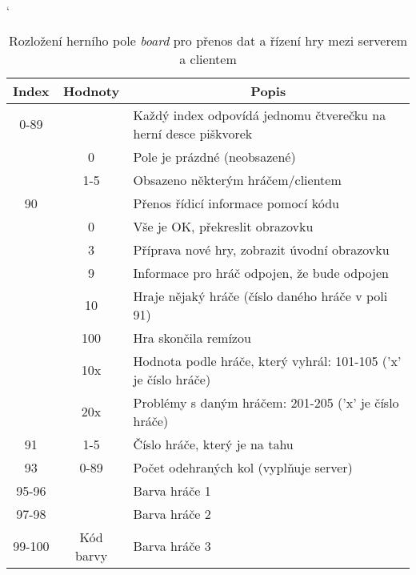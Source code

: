 \begin{table}[hbtp]
\catcode`
\caption{\label{tab:board_content}Rozložení herního pole \textit{board} pro přenos dat a řízení hry mezi serverem a clientem}
\begin{tabular}{|c|c|l|}
\hline
Index   & Hodnoty     & \multicolumn{1}{c|}{Popis}                                      \\ \hline
0-89    &             & Každý index odpovídá jednomu čtverečku na herní desce piškvorek \\ \cline{2-3} 
        & 0           & Pole je prázdné (neobsazené)                                    \\ \cline{2-3} 
        & 1-5         & Obsazeno některým hráčem/clientem                               \\ \hline
90      &             & Přenos řídicí informace pomocí kódu                             \\ \cline{2-3} 
        & 0           & Vše je OK, překreslit obrazovku                                 \\ \cline{2-3} 
        & 3           & Příprava nové hry, zobrazit úvodní obrazovku                    \\ \cline{2-3} 
        & 9           & Informace pro hráč odpojen, že bude odpojen                     \\ \cline{2-3} 
        & 10          & Hraje nějaký hráče (číslo daného hráče v poli 91)               \\ \cline{2-3} 
        & 100         & Hra skončila remízou                                            \\ \cline{2-3} 
        & 10x         & Hodnota podle hráče, který vyhrál: 101-105 ('x' je číslo hráče) \\ \cline{2-3} 
        & 20x         & Problémy s daným hráčem: 201-205 ('x' je číslo hráče)           \\ \hline
91      & 1-5         & Číslo hráče, který je na tahu                                   \\ \hline
93      & 0-89        & Počet odehraných kol (vyplňuje server)                          \\ \hline
95-96   &             & Barva hráče 1                                                   \\ \cline{1-1} \cline{3-3} 
97-98   &             & Barva hráče 2                                                   \\ \cline{1-1} \cline{3-3} 
99-100  & Kód barvy   & Barva hráče 3                                                   \\ \cline{1-1} \cline{3-3} 

\end{tabular}
\end{table}
